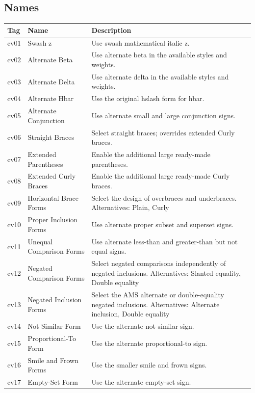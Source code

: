 \subsection*{Names}

\begin{longtable}{>{\ttfamily}lp{}p{}}
\toprule
\normalfont Tag & Name & Description \\
\midrule
\endhead
cv01 & Swash z & Use swash mathematical italic z. \\
cv02 & Alternate Beta & Use alternate beta in the available styles and weights.
\\
cv03 & Alternate Delta & Use alternate delta in the available styles and
weights. \\
cv04 & Alternate Hbar & Use the original hslash form for hbar. \\
cv05 & Alternate Conjunction & Use alternate small and large conjunction signs.
\\
cv06 & Straight Braces & Select straight braces; overrides extended Curly
braces. \\
cv07 & Extended Parentheses & Enable the additional large ready-made
parentheses. \\
cv08 & Extended Curly Braces & Enable the additional large ready-made Curly
braces. \\
cv09 & Horizontal Brace Forms & Select the design of overbraces and
underbraces. Alternatives: Plain, Curly \\
cv10 & Proper Inclusion Forms & Use alternate proper subset and superset signs.
\\
cv11 & Unequal Comparison Forms & Use alternate less-than and greater-than but
not equal signs. \\
cv12 & Negated Comparison Forms & Select negated comparisons independently of
negated inclusions. Alternatives: Slanted equality, Double equality \\
cv13 & Negated Inclusion Forms & Select the AMS alternate or double-equality
negated inclusions. Alternatives: Alternate inclusion, Double equality \\
cv14 & Not-Similar Form & Use the alternate not-similar sign. \\
cv15 & Proportional-To Form & Use the alternate proportional-to sign. \\
cv16 & Smile and Frown Forms & Use the smaller smile and frown signs. \\
cv17 & Empty-Set Form & Use the alternate empty-set sign. \\

\end{longtable}
